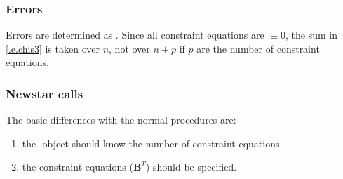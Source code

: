 \subsubsection{Errors}

Errors are determined as . Since all
constraint equations are $\equiv 0$, the sum in \eqref{.e.chis3} is
taken over $n$, not over $n+p$ if $p$ are the number of constraint equations.

\subsubsection{Newstar calls}

The basic differences with the normal procedures are:
\begin{enumerate}
\item the \LSQ-object should know the number of constraint equations \Mn
\item the constraint equations ($\mathbf{B}^{T}$) should be specified. \Mn
\end{enumerate}

